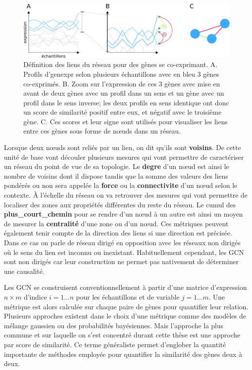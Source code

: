 \begin{figure}[ht]
    \centering
    \includegraphics[width=\textwidth]{img/intro/3_coexpr/intro_3_coexpr_expr_group_sign.pdf}
    \caption[Définition des liens du réseau pour des gènes se co-exprimant.]{Définition des liens du réseau pour des gènes se co-exprimant. A. Profils d'\gls{genexpr} selon plusieurs échantillons avec en bleu 3 gènes co-exprimés. B. Zoom sur l'expression de ces 3 gènes avec mise en avant de deux gènes avec un profil dans un sens et un gène avec un profil dans le sens inverse; les deux profils en sens identique ont donc un score de similarité positif entre eux, et négatif avec le troisième gène. C. Ces scores et leur signe sont utilisés pour visualiser les liens entre ces gènes sous forme de nœuds dans un réseau.}
    \label{fig:coexpr_corr_weight_sign}
\end{figure}

Lorsque deux nœuds sont reliés par un lien, on dit qu'ils sont \textbf{\glspl{voisin}}. De cette unité de base vont découler plusieurs mesures qui vont permettre de caractériser un réseau du point de vue de sa topologie. Le \textbf{\gls{degre}} d'un nœud est ainsi le nombre de voisins dont il dispose tandis que la somme des valeurs des liens pondérés ou non sera appelée la \textbf{force} ou la \textbf{connectivite} d'un nœud selon le contexte. À l'échelle du réseau on va retrouver des mesures qui vont permettre de localiser des zones aux propriétés différentes du reste du réseau. Le cumul des \textbf{\gls{plus_court_chemin}} pour se rendre d'un nœud à un autre est ainsi un moyen de mesurer la \textbf{centralité} d'une zone ou d'un nœud. Ces métriques peuvent également tenir compte de la direction des liens si une direction est précisée. Dans ce cas on parle de réseau dirigé en opposition avec les réseaux non dirigés où le sens du lien est inconnu ou inexistant. Habituellement cependant, les \acrshort{GCN} sont non dirigés car leur construction ne permet pas nativement de déterminer une causalité. 

Les \acrshort{GCN} se construisent conventionnellement à partir d'une matrice d'expression $n \times m$ d'indice $i = 1 \dots n$ pour les échantillons et de variable $j = 1 \dots m$. Une métrique est alors calculée sur chaque paire de gènes pour quantifier leur relation. Plusieurs approches existent dans le choix d'une métrique comme des modèles de mélange gaussien ou des probabilités bayésiennes. Mais l'approche la plus commune et sur laquelle on s'est concentré durant cette thèse est une approche par score de similarité. Ce terme généraliste permet d'englober la quantité importante de méthodes employée pour quantifier la similarité des gènes deux à deux. 



